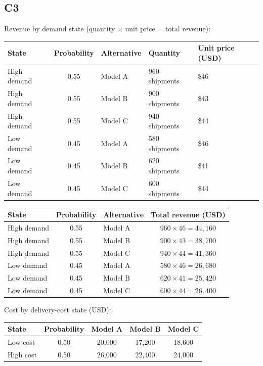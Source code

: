 \begin{ExamProblems}
		\subsection*{C3}
		Revenue by demand state (quantity $\times$ unit price = total revenue):
		\begin{center}
			\begin{tabular}{l c l l l}
				\toprule
				State & Probability & Alternative & Quantity & Unit price (USD) \\
				\midrule
				High demand & 0.55 & Model A & 960 shipments & \$46 \\
				High demand & 0.55 & Model B & 900 shipments & \$43 \\
				High demand & 0.55 & Model C & 940 shipments & \$44 \\
				Low demand & 0.45 & Model A & 580 shipments & \$46 \\
				Low demand & 0.45 & Model B & 620 shipments & \$41 \\
				Low demand & 0.45 & Model C & 600 shipments & \$44 \\
				\bottomrule
			\end{tabular}
		\end{center}
		\begin{center}
			\begin{tabular}{l c l c}
				\toprule
				State & Probability & Alternative & Total revenue (USD) \\
				\midrule
				High demand & 0.55 & Model A & $960 \times 46 = 44{,}160$ \\
				High demand & 0.55 & Model B & $900 \times 43 = 38{,}700$ \\
				High demand & 0.55 & Model C & $940 \times 44 = 41{,}360$ \\
				Low demand & 0.45 & Model A & $580 \times 46 = 26{,}680$ \\
				Low demand & 0.45 & Model B & $620 \times 41 = 25{,}420$ \\
				Low demand & 0.45 & Model C & $600 \times 44 = 26{,}400$ \\
				\bottomrule
			\end{tabular}
		\end{center}
		
		Cost by delivery-cost state (USD):
		\begin{center}
			\begin{tabular}{l c c c c}
				\toprule
				State & Probability & Model A & Model B & Model C \\
				\midrule
				Low cost & 0.50 & 20{,}000 & 17{,}200 & 18{,}600 \\
				High cost & 0.50 & 26{,}000 & 22{,}400 & 24{,}000 \\
				\bottomrule
			\end{tabular}
		\end{center}
		

\end{ExamProblems}
